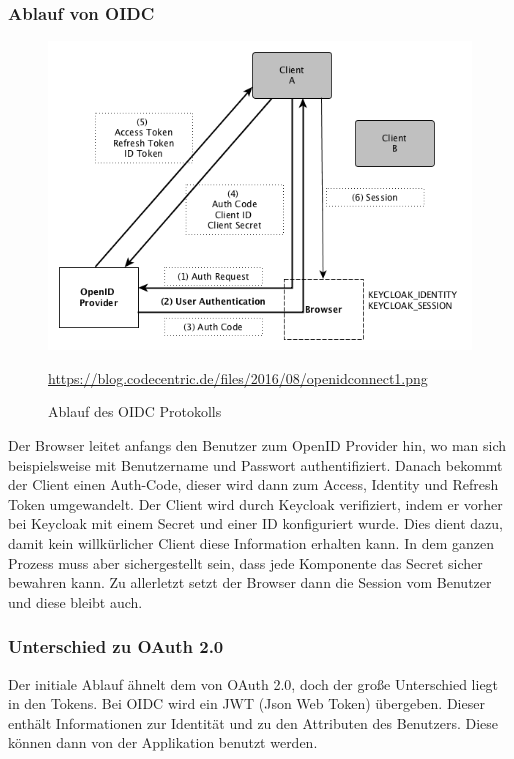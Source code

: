 \subsubsection{Ablauf von OIDC}
\begin{figure}[htp]
    \centering
    \includegraphics[scale=0.6]{pics/Ablauf_OIDC.png}
    \caption{Ablauf des OIDC Protokolls}
    \small \url{https://blog.codecentric.de/files/2016/08/openidconnect1.png} 
    \label{fig:impl:OIDCProtocoll}
\end{figure}

Der Browser leitet anfangs den Benutzer zum OpenID Provider hin, wo man sich beispielsweise mit Benutzername und Passwort authentifiziert.
Danach bekommt der Client einen Auth-Code, dieser wird dann zum Access, Identity und Refresh Token umgewandelt.
Der Client wird durch Keycloak verifiziert, indem er vorher bei Keycloak mit einem Secret und einer ID konfiguriert wurde. Dies dient dazu, damit kein willkürlicher Client diese Information erhalten kann.
In dem ganzen Prozess muss aber sichergestellt sein, dass jede Komponente das Secret sicher bewahren kann.
Zu allerletzt setzt der Browser dann die Session vom Benutzer und diese bleibt auch. \cite{KeycloakCodeCentric}

\subsubsection{Unterschied zu OAuth 2.0}
Der initiale Ablauf ähnelt dem von OAuth 2.0, doch der große Unterschied liegt in den Tokens.
Bei OIDC wird ein JWT (Json Web Token) übergeben. Dieser enthält Informationen zur Identität und zu den Attributen des Benutzers.
Diese können dann von der Applikation benutzt werden. \cite{KeycloakCodeCentric}


